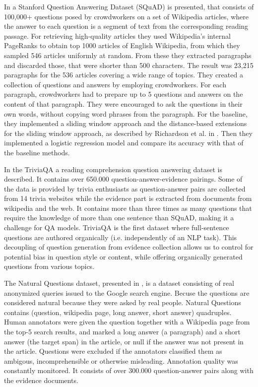 \documentclass[fleqn,moreauthors,10pt]{ds_report}
\begin{document}
In \cite{rajpurkar-etal-2016-squad} a Stanford Question Answering Dataset (SQuAD) is presented, that consists of 100,000+ questions posed by crowdworkers on a set of Wikipedia articles, where the answer to each question is a segment of text from the corresponding reading passage. For retrieving high-quality articles they used Wikipedia's internal PageRanks to obtain top 1000 articles of English Wikipedia, from which they sampled 546 articles uniformly at random. From these they extracted paragraphs and discarded those, that were shorter than 500 characters. The result was 23,215 paragraphs for the 536 articles covering a wide range of topics. They created a collection of questions and answers by employing crowdworkers. For each paragraph, crowdworkers had to prepare up to 5 questions and answers on the content of that paragraph. They were encouraged to ask the questions in their own words, without copying word phrases from the paragraph. For the baseline, they implemented a sliding window approach and the distance-based extensions for the sliding window approach, as described by Richardson et al. in \cite{richardson2013mctest}. Then they implemented a logistic regression model and compare its accuracy with that of the baseline methods.

In \cite{triviaqa} the TriviaQA a reading comprehension question answering dataset is described. It contains over 650.000 question-answer-evidence pairings. Some of the data is provided by trivia enthusiasts as question-answer pairs are collected from 14 trivia websites while the evidence part is extracted from documents from wikipedia and the web. It contains more than three times as many questions that require the knowledge of more than one sentence than SQuAD, making it a challenge for QA models.  TriviaQA is the first dataset where full-sentence questions are authored organically (i.e. independently of an NLP task). This decoupling of question generation from evidence collection allows us to control for potential bias in question style or content, while offering organically generated questions from various topics.

The Natural Questions dataset, presented in \cite{naturalqa}, is a dataset consisting of real anonymized queries issued to the Google search engine. Becuse the questions are considered natural because they were asked by real people. Natural Questions contains (question, wikipedia page, long answer, short answer) quadruples. Human annotators were given the question together with a Wikipedia page from the top-5 search results, and marked a long answer (a paragraph) and a short answer (the target span) in the article, or null if the answer was not present in the article. Questions were excluded if the annotators classified them as ambigous, incomprehensible or otherwise misleading. Annotation quality was constantly monitored. It consists of over 300.000 question-answer pairs along with the evidence documents.
\end{document}
